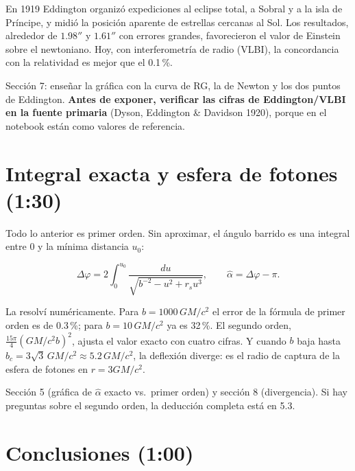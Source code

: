 \documentclass[11pt,a4paper]{article}
\newcommand{\rs}{r_s}
\newcommand{\ahat}{\hat\alpha}
\begin{document}
\begin{decir}
En 1919 Eddington organiz\'o expediciones al eclipse total, a Sobral y a la isla de Pr\'incipe, y midi\'o la posición aparente de estrellas cercanas al Sol. Los resultados, alrededor de $1.98''$ y $1.61''$ con errores grandes, favorecieron el valor de Einstein sobre el newtoniano. Hoy, con interferometr\'ia de radio (VLBI), la concordancia con la relatividad es mejor que el 0.1\,\%.
\end{decir}

\begin{notebook}
Secci\'on 7: ense\~nar la gr\'afica con la curva de RG, la de Newton y los dos puntos de Eddington. \textbf{Antes de exponer, verificar las cifras de Eddington/VLBI en la fuente primaria} (Dyson, Eddington \& Davidson 1920), porque en el notebook est\'an como valores de referencia.
\end{notebook}

\section{Integral exacta y esfera de fotones \hfill\small(1:30)}

\begin{decir}
Todo lo anterior es primer orden. Sin aproximar, el \'angulo barrido es una integral entre $0$ y la m\'inima distancia $u_0$:
\end{decir}
\[
\Delta\varphi=2\int_0^{u_0}\frac{du}{\sqrt{b^{-2}-u^2+\rs u^3}},\qquad \ahat=\Delta\varphi-\pi .
\]

\begin{decir}
La resolv\'i num\'ericamente. Para $b=1000\,GM/c^2$ el error de la f\'ormula de primer orden es de 0.3\,\%; para $b=10\,GM/c^2$ ya es 32\,\%. El segundo orden, $\tfrac{15\pi}{4}(GM/c^2b)^2$, ajusta el valor exacto con cuatro cifras. Y cuando $b$ baja hasta $b_c=3\sqrt3\,GM/c^2\approx5.2\,GM/c^2$, la deflexi\'on diverge: es el radio de captura de la esfera de fotones en $r=3GM/c^2$.
\end{decir}

\begin{notebook}
Secci\'on 5 (gr\'afica de $\ahat$ exacto vs.\ primer orden) y secci\'on 8 (divergencia). Si hay preguntas sobre el segundo orden, la deducci\'on completa est\'a en 5.3.
\end{notebook}

\section{Conclusiones \hfill\small(1:00)}
\end{document}
